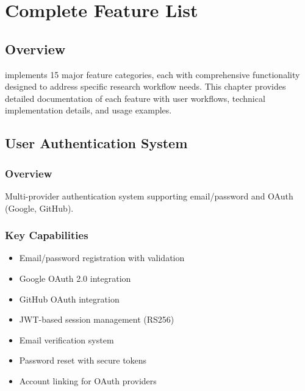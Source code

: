 \chapter{Complete Feature List}
\label{ch:feature-list}


\section{Overview}
\label{sec:features-overview}

\projectname{} \version{} implements 15 major feature categories, each with comprehensive functionality designed to address specific research workflow needs. This chapter provides detailed documentation of each feature with user workflows, technical implementation details, and usage examples.

\section{User Authentication System}
\label{sec:feature-auth}

\subsection{Overview}

Multi-provider authentication system supporting email/password and OAuth (Google, GitHub).

\subsection{Key Capabilities}

\begin{itemize}[leftmargin=*]
    \item Email/password registration with validation
    \item Google OAuth 2.0 integration
    \item GitHub OAuth integration
    \item JWT-based session management (RS256)
    \item Email verification system
    \item Password reset with secure tokens
    \item Account linking for OAuth providers
\end{itemize}

